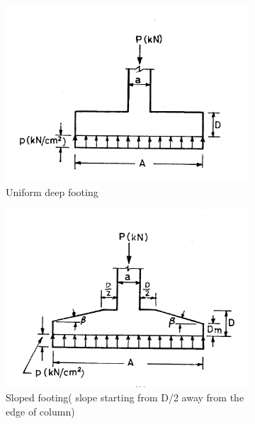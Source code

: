 \documentclass{report}
\begin{document}
\begin{figure}
  \begin{subfigure}[b]{0.5\textwidth}
    \includegraphics[width=\textwidth]{images/fig2291.png}
    \caption{Uniform deep footing}
    \label{fig:12.1}
  \end{subfigure}
  \begin{subfigure}[b]{0.5\textwidth}
    \includegraphics[width=\textwidth]{images/fig2292.png}
    \caption{Sloped footing( slope starting from D/2 away from the edge of column)}
    \label{fig:2}
  \end{subfigure}
 \begin{subfigure}[b]{0.5\textwidth}

\end{subfigure}
\end{figure}
\end{document}
